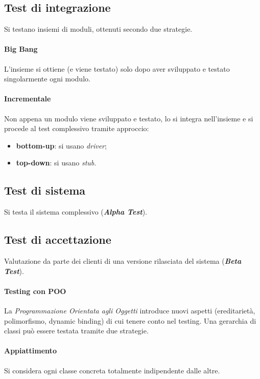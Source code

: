 \subsection{Test di integrazione}
Si testano insiemi di moduli, ottenuti secondo due strategie.

\paragraph{Big Bang} L'insieme si ottiene (e viene testato) solo dopo aver sviluppato e testato singolarmente ogni modulo.

\paragraph{Incrementale} Non appena un modulo viene sviluppato e testato, lo si integra nell'insieme e si procede al test complessivo tramite approccio:
\begin{itemize}
    \item \textbf{bottom-up}: si usano \textit{driver};
    \item \textbf{top-down}: si usano \textit{stub}.
\end{itemize}

\subsection{Test di sistema} Si testa il sistema complessivo (\textbf{\textit{Alpha Test}}).

\subsection{Test di accettazione} Valutazione da parte dei clienti di una versione rilasciata del sistema (\textbf{\textit{Beta Test}}).

\newpage
\paragraph{Testing con POO}

La \textit{Programmazione Orientata agli Oggetti} introduce nuovi aspetti (ereditarietà, polimorfismo, dynamic binding) di cui tenere conto nel testing. Una gerarchia di classi può essere testata tramite due strategie.

\paragraph{Appiattimento}  Si considera ogni classe concreta totalmente indipendente dalle altre.

